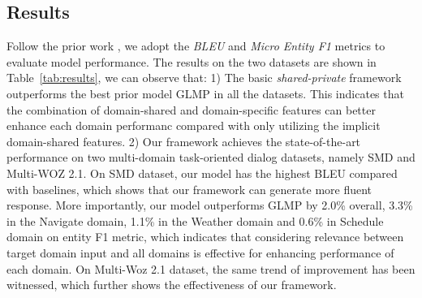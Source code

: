 \documentclass[11pt,a4paper]{article}
\begin{document}
\subsection{Results}
Follow the prior work \cite{eric-etal-2017-key, madotto-etal-2018-mem2seq,wen-etal-2018-sequence, DBLP:conf/iclr/WuSX19,qin-etal-2019-entity}, we adopt the \textit{BLEU} and \textit{Micro Entity F1} metrics to evaluate model performance.
The results on the two datasets are shown in Table~\ref{tab:results}, we can observe that:
1) The basic \textit{shared-private} framework outperforms the best prior model GLMP in all the datasets.
This indicates that the combination of domain-shared and domain-specific features can better enhance each domain performanc compared with only utilizing the implicit domain-shared features.
2) Our framework achieves the state-of-the-art performance on two multi-domain task-oriented dialog datasets, namely SMD and Multi-WOZ 2.1.
On SMD dataset, our model has the highest BLEU compared with baselines, which shows that our framework can generate more fluent response.
More importantly, our model outperforms GLMP by 2.0\% overall, 3.3\% in the Navigate domain, 1.1\% in the Weather domain and 0.6\% in Schedule domain on entity F1 metric, which indicates that considering relevance between target domain input and all domains is effective for enhancing performance of each domain.
On Multi-Woz 2.1 dataset, the same trend of improvement has been witnessed, which further shows the effectiveness of our framework.
\end{document}
